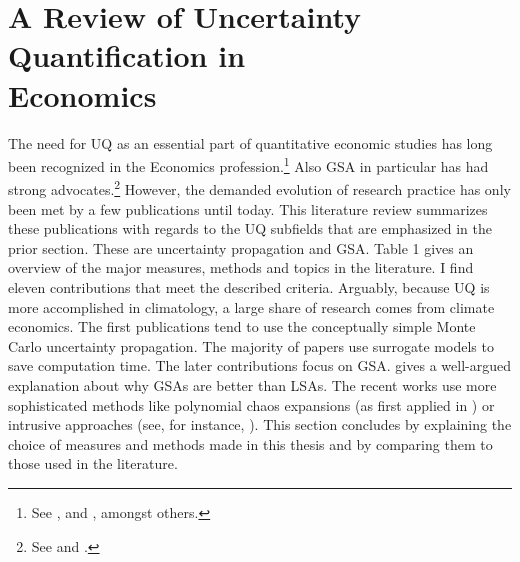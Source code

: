 \documentclass[a4paper,12pt]{article}
\begin{document}
\section{A Review of Uncertainty Quantification in\\ Economics}
\thispagestyle{plain} %

The need for UQ as an essential part of quantitative economic studies has long been recognized in the Economics profession.\footnote{See \cite{Hansen.1996}, \cite{Kydland.1992} and \cite{Canova.1994}, amongst others.} Also GSA in particular has had strong advocates.\footnote{See \cite{Canova.1995} and \cite{Gregory.1995}.} However, the demanded evolution of research practice has only been met by a few publications until today. This literature review summarizes these publications with regards to the UQ subfields that are emphasized in the prior section. These are uncertainty propagation and GSA. Table 1 gives an overview of the major measures, methods and topics in the literature. I find eleven contributions that meet the described criteria. Arguably, because UQ is more accomplished in climatology, a large share of research comes from climate economics. The first publications tend to use the conceptually simple Monte Carlo uncertainty propagation.  The majority of papers use surrogate models to save computation time. The later contributions focus on GSA. \cite{Harenberg.2019} gives a well-argued explanation about why GSAs are better than LSAs. The recent works use more sophisticated methods like polynomial chaos expansions (as first applied in \cite{Harenberg.2019}) or intrusive approaches (see, for instance, \cite{Scheidegger.2019}). This section concludes by explaining the choice of measures and methods made in this thesis and by comparing them to those used in the literature.
\end{document}
